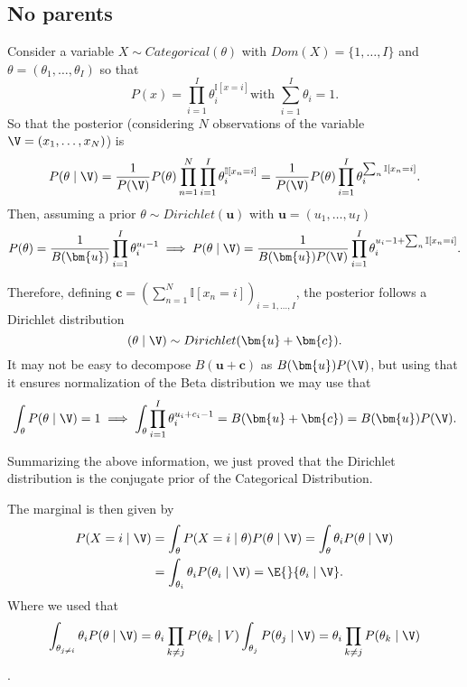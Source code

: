  \subsection{No parents}

 Consider a variable \(X \sim Categorical(\theta)\) with
 \(Dom(X) = \{1, \dots, I\} \) and \(\theta = (\theta_{1},\dots, \theta_{I})\) so that
 \[
   P(x) = \prod_{i = 1}^{I}\theta_{i}^{\mathbb{I}[x = i]} \text{
   with  } \sum_{i=1}^{I}\theta_{i} = 1.
\]
So that the posterior (considering \(N\) observations of the variable
\(\V = (x_{1}, \dots, x_{N})\)) is
\[
  P(\theta \mid \V) = \frac{1}{P(\V)} P(\theta) \prod_{n = 1}^{N}\prod_{i =1 }^{I}\theta_{i}^{\mathbb{I}[x_{n} = i]} =  \frac{1}{P(\V)} P(\theta) \prod_{i = 1}^{I} \theta_{i}^{\sum_{n} \mathbb{I}[x_{n}=i]}.
\]
Then, assuming a prior \(\theta \sim Dirichlet(\bm{u})\) with \( \bm{u} = (u_{1}, \dots, u_{I})\)
\[
  P(\theta) = \frac{1}{B(\bm{u})}\prod_{i =1}^{I}\theta_{i}^{u_{i}-1} \implies P(\theta \mid \V) = \frac{1}{B(\bm{u})P(\V)}\prod_{i=1}^{I}\theta_{i}^{u_{i}-1 + \sum_{n}\mathbb{I}[x_{n} = i]}.
\]

Therefore, defining \(\bm{c} = ( \sum_{n=1}^{N}\mathbb{I}[x_{n} = i])_{i = 1,\dots,I}\), the posterior follows a Dirichlet distribution
\[
  (\theta \mid \V) \sim Dirichlet(\bm{u} + \bm{c}).
\]
It may not be easy to decompose \(B(\bm{u} + \bm{c})\) as \(B(\bm{u})P(\V)\), but using that it ensures normalization of the Beta distribution we may use that
\[
  \int_{\theta} P(\theta \mid \V) = 1 \implies \int_{\theta}\prod_{i=1}^{I}\theta_{i}^{u_{i}+c_{i}-1} = B(\bm{u} + \bm{c}) = B(\bm{u})P(\V).
\]

\begin{remark}
Summarizing the above information, we just proved that the Dirichlet distribution is the conjugate prior of the Categorical Distribution.
\end{remark}

The marginal is then given by
\[
  \begin{aligned}
    P(X=i \mid \V) &= \int_{\theta}P(X=i \mid \theta)P(\theta \mid \V) =  \int_{\theta}\theta_{i}P(\theta \mid \V)\\
    &=  \int_{\theta_{i}}\theta_{i}P(\theta_{i} \mid \V) = \E{}{\theta_{i} \mid \V}.
\end{aligned}
\]
Where we used that
\[\int_{\theta_{j \neq i}}\theta_{i} P(\theta \mid \V) = \theta_{i}\prod_{k\neq j}P(\theta_{k} \mid V) \int_{\theta_{j}}P(\theta_{j}\mid \V) = \theta_{i} \prod_{k \neq j}P(\theta_{k} \mid \V)\].

